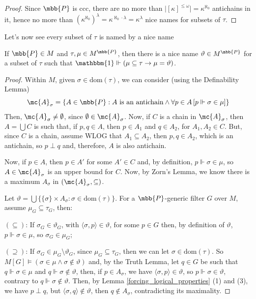 \begin{proof}\label{nice_names_size}
    Since $\mbb{P}$ is ccc, there are no more than $\lvert[\kappa]^{\leq\omega}\rvert=\kappa^{\aleph_0}$ antichains in it, hence no more than $(\kappa^{\aleph_0})^\lambda=\kappa^{\aleph_0\cdot\lambda}=\kappa^\lambda$ nice names for subsets of $\tau$.
\end{proof}

Let's now see every subset of $\tau$ is named by a nice name

\begin{lemma}{}{}\label{nice_names_for_subsets}
    If $\mbb{P}\in M$ and $\tau,\mu\in M^{\mbb{P}}$, then there is a nice name $\vartheta\in M^{\mbb{P}}$ for a subset of $\tau$ such that $\mathbbm{1}\Vdash(\mu\subseteq\tau\to\mu=\vartheta)$.
\end{lemma}

\begin{proof}
    Within $M$, given $\sigma\in\text{dom}(\tau)$, we can consider (using the Definability Lemma)
    $$\mc{A}_\sigma=\{A\in\mbb{P}:A\text{ is an antichain}\wedge\forall p\in A\,[p\Vdash\sigma\in\mu]\}$$
    Then, $\mc{A}_\sigma\neq\emptyset$, since $\emptyset\in\mc{A}_\sigma$. Now, if $C$ is a chain in $\mc{A}_\sigma$, then $A=\bigcup C$ is such that, if $p,q\in A$, then $p\in A_1$ and $q\in A_2$, for $A_1,A_2\in C$. But, since $C$ is a chain, assume WLOG that $A_1\subseteq A_2$, then $p,q\in A_2$, which is an antichain, so $p\perp q$ and, therefore, $A$ is also antichain.

    Now, if $p\in A$, then $p\in A'$ for some $A'\in C$ and, by definition, $p\Vdash\sigma\in\mu$, so $A\in\mc{A}_\sigma$ is an upper bound for $C$. Now, by Zorn's Lemma, we know there is a maximum $A_\sigma$ in $(\mc{A}_\sigma,\subseteq)$.

    Let $\vartheta=\bigcup\{\{\sigma\}\times A_\sigma:\sigma\in\text{dom}(\tau)\}$. For a $\mbb{P}$-generic filter $G$ over $M$, assume $\mu_G\subseteq\tau_G$, then:

    $(\subseteq)$: If $\sigma_G\in\vartheta_G$, with $\langle\sigma,p\rangle\in\vartheta$, for some $p\in G$ then, by definition of $\vartheta$, $p\Vdash\sigma\in\mu$, so $\sigma_G\in\mu_G$;

    $(\supseteq)$: If $\sigma_G\in\mu_G\setminus\vartheta_G$, since $\mu_G\subseteq\tau_G$, then we can let $\sigma\in\text{dom}(\tau)$. So $M[G]\vDash(\sigma\in\mu\wedge\sigma\notin\vartheta)$ and, by the Truth Lemma, let $q\in G$ be such that $q\Vdash \sigma\in\mu$ and $q\Vdash\sigma\notin\vartheta$, then, if $p\in A_\sigma$, we have $\langle\sigma,p\rangle\in\vartheta$, so $p\Vdash\sigma\in\vartheta$, contrary to $q\Vdash\sigma\notin\vartheta$. Then, by Lemma \ref{forcing_logical_properties} (1) and (3), we have $p\perp q$, but $\langle\sigma,q\rangle\notin\vartheta$, then $q\notin A_\sigma$, contradicting its maximality.
\end{proof}


